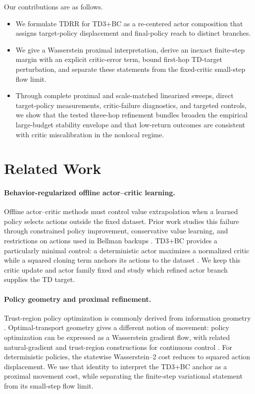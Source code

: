\documentclass[letterpaper]{article}
\begin{document}
Our contributions are as follows.
\begin{itemize}
    \item We formulate TDRR for TD3+BC as a re-centered actor composition that assigns target-policy displacement and final-policy reach to distinct branches.
    \item We give a Wasserstein proximal interpretation, derive an inexact finite-step margin with an explicit critic-error term, bound first-hop TD-target perturbation, and separate these statements from the fixed-critic small-step flow limit.
    \item Through complete proximal and scale-matched linearized sweeps, direct target-policy measurements, critic-failure diagnostics, and targeted controls, we show that the tested three-hop refinement bundles broaden the empirical large-budget stability envelope and that low-return outcomes are consistent with critic miscalibration in the nonlocal regime.
\end{itemize}

\section{Related Work}
\label{sec:related}

\paragraph{Behavior-regularized offline actor--critic learning.}
Offline actor--critic methods must control value extrapolation when a learned
policy selects actions outside the fixed dataset. Prior work studies this
failure through constrained policy improvement, conservative value learning,
and restrictions on actions used in Bellman backups
\citep{fujimoto2019offpolicy,kumar2019bear}. TD3+BC provides a particularly
minimal control: a deterministic actor maximizes a normalized critic while a
squared cloning term anchors its actions to the dataset
\citep{fujimoto2021minimalist}. We keep this critic update and actor family
fixed and study which refined actor branch supplies the TD target.

\paragraph{Policy geometry and proximal refinement.}
Trust-region policy optimization is commonly derived from information geometry
\citep{amari2000methods,schulman2015trust}. Optimal-transport geometry gives a
different notion of movement: policy optimization can be expressed as a
Wasserstein gradient flow, with related natural-gradient and trust-region
constructions for continuous control
\citep{zhang2018policy,moskovitz2020efficient,terpin2022trust,song2023metric}.
For deterministic policies, the statewise Wasserstein--2 cost reduces to
squared action displacement. We use that identity to interpret the TD3+BC
anchor as a proximal movement cost, while separating the finite-step
variational statement from its small-step flow limit.
\end{document}
